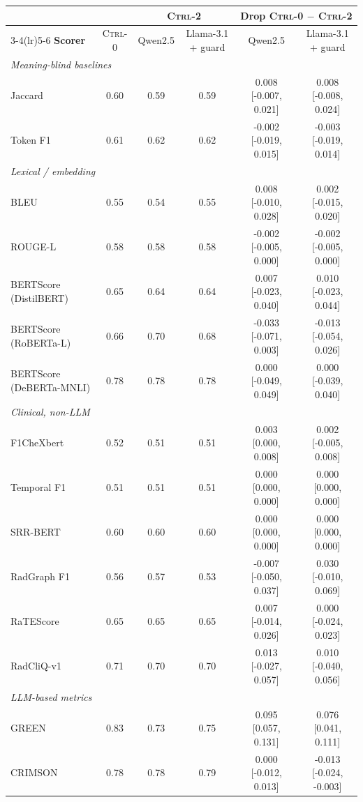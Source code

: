 \begin{tabular}{lccccc}
\toprule
 & & \multicolumn{2}{c}{\textbf{\textsc{Ctrl-2}}} & \multicolumn{2}{c}{\textbf{Drop \textsc{Ctrl-0} $-$ \textsc{Ctrl-2}}} \\
\cmidrule(lr){3-4}\cmidrule(lr){5-6}
\textbf{Scorer} & \textsc{Ctrl-0} & Qwen2.5 & Llama-3.1 + guard & Qwen2.5 & Llama-3.1 + guard \\
\midrule
\multicolumn{6}{l}{\textit{Meaning-blind baselines}} \\
Jaccard & 0.60 & 0.59 & 0.59 & 0.008 [-0.007, 0.021] & 0.008 [-0.008, 0.024] \\
Token F1 & 0.61 & 0.62 & 0.62 & -0.002 [-0.019, 0.015] & -0.003 [-0.019, 0.014] \\
\multicolumn{6}{l}{\textit{Lexical / embedding}} \\
BLEU & 0.55 & 0.54 & 0.55 & 0.008 [-0.010, 0.028] & 0.002 [-0.015, 0.020] \\
ROUGE-L & 0.58 & 0.58 & 0.58 & -0.002 [-0.005, 0.000] & -0.002 [-0.005, 0.000] \\
BERTScore (DistilBERT) & 0.65 & 0.64 & 0.64 & 0.007 [-0.023, 0.040] & 0.010 [-0.023, 0.044] \\
BERTScore (RoBERTa-L) & 0.66 & 0.70 & 0.68 & -0.033 [-0.071, 0.003] & -0.013 [-0.054, 0.026] \\
BERTScore (DeBERTa-MNLI) & 0.78 & 0.78 & 0.78 & 0.000 [-0.049, 0.049] & 0.000 [-0.039, 0.040] \\
\multicolumn{6}{l}{\textit{Clinical, non-LLM}} \\
F1CheXbert & 0.52 & 0.51 & 0.51 & 0.003 [0.000, 0.008] & 0.002 [-0.005, 0.008] \\
Temporal F1 & 0.51 & 0.51 & 0.51 & 0.000 [0.000, 0.000] & 0.000 [0.000, 0.000] \\
SRR-BERT & 0.60 & 0.60 & 0.60 & 0.000 [0.000, 0.000] & 0.000 [0.000, 0.000] \\
RadGraph F1 & 0.56 & 0.57 & 0.53 & -0.007 [-0.050, 0.037] & 0.030 [-0.010, 0.069] \\
RaTEScore & 0.65 & 0.65 & 0.65 & 0.007 [-0.014, 0.026] & 0.000 [-0.024, 0.023] \\
RadCliQ-v1 & 0.71 & 0.70 & 0.70 & 0.013 [-0.027, 0.057] & 0.010 [-0.040, 0.056] \\
\multicolumn{6}{l}{\textit{LLM-based metrics}} \\
GREEN & 0.83 & 0.73 & 0.75 & 0.095 [0.057, 0.131] & 0.076 [0.041, 0.111] \\
CRIMSON & 0.78 & 0.78 & 0.79 & 0.000 [-0.012, 0.013] & -0.013 [-0.024, -0.003] \\
\bottomrule
\end{tabular}